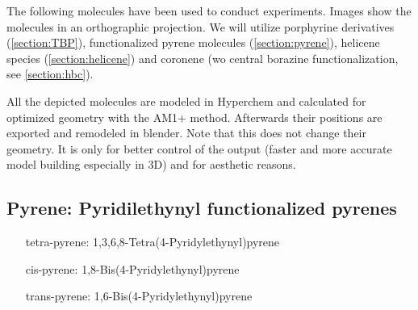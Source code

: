 \label{chapter:used-molecules}
The following molecules have been used to conduct experiments. Images show the molecules in an orthographic projection. We will utilize porphyrine derivatives (\autoref{section:TBP}), functionalized pyrene molecules (\autoref{section:pyrene}), helicene species (\autoref{section:helicene}) and coronene (w\/o central borazine functionalization, see \autoref{section:hbc}).

All the depicted molecules are modeled in Hyperchem\cite{_hyperchemtm_1111} and calculated for optimized geometry with the AM1+ method. Afterwards their positions are exported and remodeled in blender. Note that this does not change their geometry. It is only for better control of the output (faster and more accurate model building especially in 3D) and for aesthetic reasons.

\subsection{Pyrene: Pyridilethynyl functionalized pyrenes}
\label{sec:pyrene}
\begin{itemize}
	\item[tetra-pyrene:] 1,3,6,8-Tetra(4-Pyridylethynyl)pyrene
	\item[cis-pyrene:] 1,8-Bis(4-Pyridylethynyl)pyrene
	\item[trans-pyrene:] 1,6-Bis(4-Pyridylethynyl)pyrene
\end{itemize}


